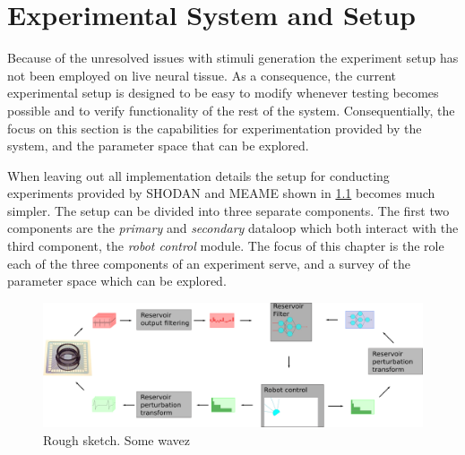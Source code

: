 \chapter{Experimental System and Setup}
Because of the unresolved issues with stimuli generation the experiment setup has not been
employed on live neural tissue.
As a consequence, the current experimental setup is designed to be easy to
modify whenever testing becomes possible and to verify functionality of the rest
of the system.
Consequentially, the focus on this section is the capabilities for experimentation
provided by the system, and the parameter space that can be explored.\par
%
When leaving out all implementation details the setup for conducting experiments
provided by SHODAN and MEAME shown in \ref{figExperimentLoop} becomes much simpler.
The setup can be divided into three separate components.
The first two components are the \emph{primary} and \emph{secondary} dataloop
which both interact with the third component, the \emph{robot control} module.
The focus of this chapter is the role each of the three components of an
experiment serve, and a survey of the parameter space which can be explored. 
\begin{figure}[h!]
  \centering
  \includegraphics[width=1\textwidth]{fig/experimentLoop.png}
  \caption{Rough sketch.
    Some wavez
  }
  \label{figExperimentLoop}
\end{figure}
%
